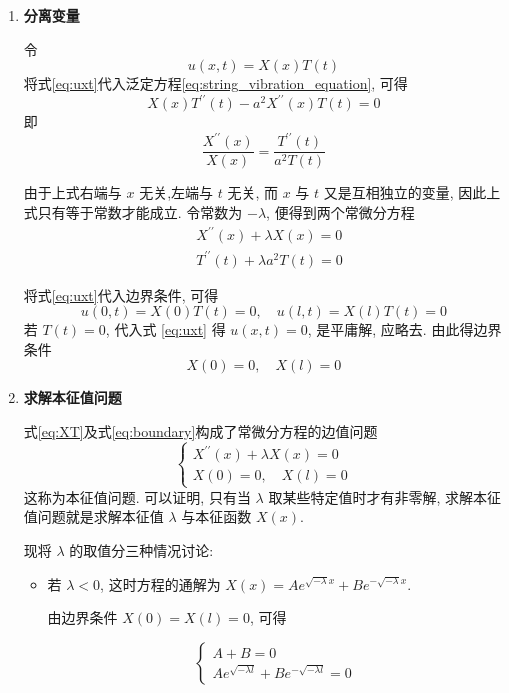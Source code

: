\begin{enumerate}
  \item \textbf{分离变量}

    令
    \begin{equation}
        u(x, t)=X(x) T(t)
        \label{eq:uxt}
    \end{equation}
    将式\eqref{eq:uxt}代入泛定方程\eqref{eq:string_vibration_equation}, 可得
    $$
    X(x) T^{\prime \prime}(t)-a^{2} X^{\prime \prime}(x) T(t)=0
    $$
即
$$
\frac{X^{\prime \prime}(x)}{X(x)}=\frac{T^{\prime \prime}(t)}{a^{2} T(t)}
$$

由于上式右端与 $x$ 无关,左端与 $t$ 无关, 而 $x$ 与 $t$ 又是互相独立的变量, 
因此上式只有等于常数才能成立. 令常数为 $-\lambda$, 便得到两个常微分方程
\begin{equation}
    \begin{aligned}
        & X^{\prime \prime}(x)+\lambda X(x)=0 \\
        & T^{\prime \prime}(t)+\lambda a^{2} T(t)=0
        \end{aligned}
        \label{eq:XT}
\end{equation}

将式\eqref{eq:uxt}代入边界条件, 可得
$$
u(0, t)=X(0) T(t)=0, \quad u(l, t)=X(l) T(t)=0
$$
若 $T(t)=0$, 代入式 \eqref{eq:uxt} 得 $u(x, t)=0$, 是平庸解, 应略去. 由此得边界条件
\begin{equation}
    X(0)=0, \quad X(l)=0
    \label{eq:boundary}
\end{equation}

\item \textbf{求解本征值问题}

式\eqref{eq:XT}及式\eqref{eq:boundary}构成了常微分方程的边值问题
$$
\left\{\begin{array}{l}
X^{\prime \prime}(x)+\lambda X(x)=0 \\
X(0)=0, \quad X(l)=0
\end{array}\right.
$$
这称为本征值问题. 
可以证明, 只有当 $\lambda$ 取某些特定值时才有非零解,
求解本征值问题就是求解本征值 $\lambda$ 与本征函数 $X(x)$.

现将 $\lambda$ 的取值分三种情况讨论:

\begin{itemize}
    \item 若 $\lambda<0$, 这时方程的通解为 $X(x)=A e^{\sqrt{-\lambda} x}+B e^{-\sqrt{-\lambda} x}$.

        由边界条件 $X(0)=X(l)=0$, 可得
        
        $$
        \left\{\begin{array}{l}
        A+B=0 \\
        A e^{\sqrt{-\lambda l}}+B e^{-\sqrt{-\lambda l}}=0
        \end{array}\right.
        $$
        

\end{itemize}
\end{enumerate}
